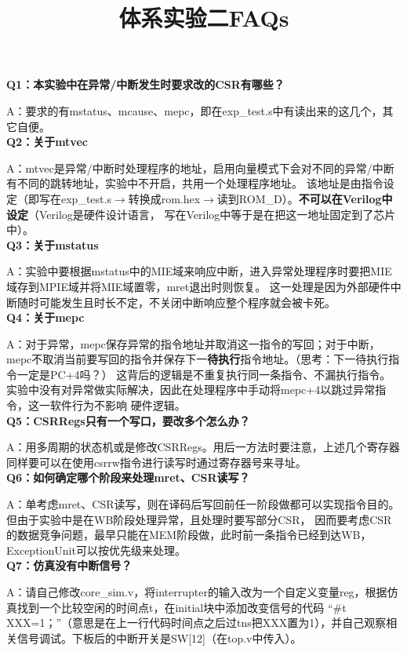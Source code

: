 \documentclass{article}
\title{\textbf{体系实验二FAQs}\vspace{-2em}}
\author{}
\date{}
\begin{document}
\maketitle

\textbf{Q1：本实验中在异常/中断发生时要求改的CSR有哪些？}

A：要求的有mstatus、mcause、mepc，即在exp\_test.s中有读出来的这几个，其它自便。\\



\textbf{Q2：关于mtvec}

A：mtvec是异常/中断时处理程序的地址，启用向量模式下会对不同的异常/中断有不同的跳转地址，实验中不开启，共用一个处理程序地址。
该地址是由指令设定（即写在exp\_test.s$\to$转换成rom.hex$\to$读到ROM\_D）。\textbf{不可以在Verilog中设定}（Verilog是硬件设计语言，
写在Verilog中等于是在把这一地址固定到了芯片中）。\\


\textbf{Q3：关于mstatus}

A：实验中要根据mstatus中的MIE域来响应中断，进入异常处理程序时要把MIE域存到MPIE域并将MIE域置零，mret退出时则恢复。
这一处理是因为外部硬件中断随时可能发生且时长不定，不关闭中断响应整个程序就会被卡死。\\


\textbf{Q4：关于mepc}

A：对于异常，mepc保存异常的指令地址并取消这一指令的写回；对于中断，mepc不取消当前要写回的指令并保存下一\textbf{待执行}指令地址。（思考：下一待执行指令一定是PC+4吗？）
这背后的逻辑是不重复执行同一条指令、不漏执行指令。实验中没有对异常做实际解决，因此在处理程序中手动将mepc+4以跳过异常指令，这一软件行为不影响
硬件逻辑。\\


\textbf{Q5：CSRRegs只有一个写口，要改多个怎么办？}

A：用多周期的状态机或是修改CSRRegs。用后一方法时要注意，上述几个寄存器同样要可以在使用csrrw指令进行读写时通过寄存器号来寻址。\\


\textbf{Q6：如何确定哪个阶段来处理mret、CSR读写？}

A：单考虑mret、CSR读写，则在译码后写回前任一阶段做都可以实现指令目的。但由于实验中是在WB阶段处理异常，且处理时要写部分CSR，
因而要考虑CSR的数据竞争问题，最早只能在MEM阶段做，此时前一条指令已经到达WB，ExceptionUnit可以按优先级来处理。\\


\textbf{Q7：仿真没有中断信号？}

A：请自己修改core\_sim.v，将interrupter的输入改为一个自定义变量reg，根据仿真找到一个比较空闲的时间点t，在initial块中添加改变信号的代码
“\#t XXX=1；”（意思是在上一行代码时间点之后过tns把XXX置为1），并自己观察相关信号调试。下板后的中断开关是SW[12]（在top.v中传入）。
\end{document}
